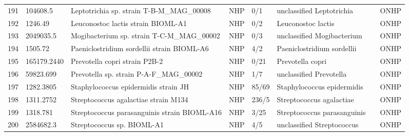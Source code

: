 \begin{longtable}{llllllll}
191 &      104608.5 &                                Leptotrichia sp. strain T-B-M\_MAG\_00008 &   NHP &       0/1 &                      unclassified Leptotrichia &                                         \cite{perez2014newly} &  ONHP \\
192 &       1246.49 &                                       Leuconostoc lactis strain BIOML-A1 &   NHP &       0/2 &                             Leuconostoc lactis &                    \cite{poyet2019library,yang2015bacteremia} &  ONHP \\
193 &     2049035.5 &                               Mogibacterium sp. strain T-C-M\_MAG\_00002 &   NHP &       0/3 &                     unclassified Mogibacterium &                                         \cite{perez2014newly} &  ONHP \\
194 &       1505.72 &                               Paeniclostridium sordellii strain BIOML-A6 &   NHP &       4/2 &                     Paeniclostridium sordellii &                        \cite{poyet2019library,kim2017genomic} &  ONHP \\
195 &   165179.2440 &                                            Prevotella copri strain P2B-2 &   NHP &      0/21 &                               Prevotella copri &                                     \cite{posteraro2019first} &  ONHP \\
196 &     59823.699 &                                  Prevotella sp. strain P-A-F\_MAG\_00002 &   NHP &       1/7 &                        unclassified Prevotella &  \cite{wallen2020characterizing,buhl2020prevotella,59823.699} &  ONHP \\
197 &     1282.3805 &                                     Staphylococcus epidermidis strain JH &   NHP &     85/69 &                     Staphylococcus epidermidis &                       \cite{otto2009staphylococcus,1282.3805} &  ONHP \\
198 &     1311.2752 &                                     Streptococcus agalactiae strain M134 &   NHP &     236/5 &                       Streptococcus agalactiae &                                         \cite{raabe2019group} &  ONHP \\
199 &      1318.781 &                             Streptococcus parasanguinis strain BIOML-A16 &   NHP &      3/25 &                    Streptococcus parasanguinis &                \cite{poyet2019library,chen2019quantification} &  ONHP \\
200 &     2584682.3 &                                               Streptococcus sp. BIOML-A1 &   NHP &       4/5 &                     unclassified Streptococcus &            \cite{poyet2019library,krzysciak2013pathogenicity} &  ONHP \\

\end{longtable}

